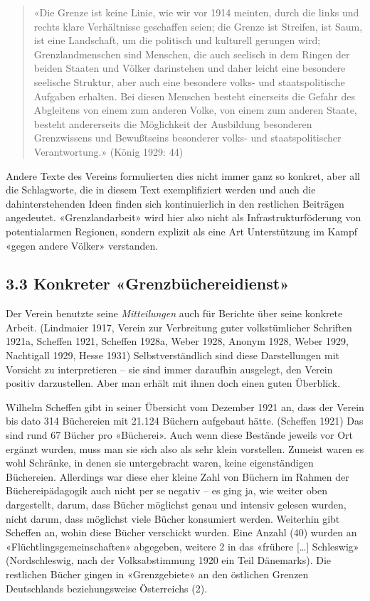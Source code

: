 \documentclass[a4paper,
fontsize=11pt,
oneside,
numbers=noperiodatend,
parskip=half-,
bibliography=totoc,
final
]{scrartcl}
\begin{document}
\begin{quote}
«Die Grenze ist keine Linie, wie wir vor 1914 meinten, durch die links
und rechts klare Verhältnisse geschaffen seien; die Grenze ist Streifen,
ist Saum, ist eine Landschaft, um die politisch und kulturell gerungen
wird; Grenzlandmenschen sind Menschen, die auch seelisch in dem Ringen
der beiden Staaten und Völker darinstehen und daher leicht eine
besondere seelische Struktur, aber auch eine besondere volks- und
staatspolitische Aufgaben erhalten. Bei diesen Menschen besteht
einerseits die Gefahr des Abgleitens von einem zum anderen Volke, von
einem zum anderen Staate, besteht andererseits die Möglichkeit der
Ausbildung besonderen Grenzwissens und Bewußtseins besonderer volks- und
staatspolitischer Verantwortung.» (König 1929: 44)
\end{quote}

Andere Texte des Vereins formulierten dies nicht immer ganz so konkret,
aber all die Schlagworte, die in diesem Text exemplifiziert werden und
auch die dahinterstehenden Ideen finden sich kontinuierlich in den
restlichen Beiträgen angedeutet. «Grenzlandarbeit» wird hier also nicht
als Infrastrukturföderung von potentialarmen Regionen, sondern explizit
als eine Art Unterstützung im Kampf «gegen andere Völker» verstanden.

\hypertarget{konkreter-grenzbuxfcchereidienst}{%
\subsection{3.3 Konkreter
«Grenzbüchereidienst»}\label{konkreter-grenzbuxfcchereidienst}}

Der Verein benutzte seine \emph{Mitteilungen} auch für Berichte über
seine konkrete Arbeit. (Lindmaier 1917, Verein zur Verbreitung guter
volkstümlicher Schriften 1921a, Scheffen 1921, Scheffen 1928a, Weber
1928, Anonym 1928, Weber 1929, Nachtigall 1929, Hesse 1931)
Selbstverständlich sind diese Darstellungen mit Vorsicht zu
interpretieren -- sie sind immer daraufhin ausgelegt, den Verein positiv
darzustellen. Aber man erhält mit ihnen doch einen guten Überblick.

Wilhelm Scheffen gibt in seiner Übersicht vom Dezember 1921 an, dass der
Verein bis dato 314 Büchereien mit 21.124 Büchern aufgebaut hätte.
(Scheffen 1921) Das sind rund 67 Bücher pro «Bücherei». Auch wenn diese
Bestände jeweils vor Ort ergänzt wurden, muss man sie sich also als sehr
klein vorstellen. Zumeist waren es wohl Schränke, in denen sie
untergebracht waren, keine eigenständigen Büchereien. Allerdings war
diese eher kleine Zahl von Büchern im Rahmen der Büchereipädagogik auch
nicht per se negativ -- es ging ja, wie weiter oben dargestellt, darum,
dass Bücher möglichst genau und intensiv gelesen wurden, nicht darum,
dass möglichst viele Bücher konsumiert werden. Weiterhin gibt Scheffen
an, wohin diese Bücher verschickt wurden. Eine Anzahl (40) wurden an
«Flüchtlingsgemeinschaften» abgegeben, weitere 2 in das «frühere
{[}\ldots{]} Schleswig» (Nordschleswig, nach der Volksabstimmung 1920
ein Teil Dänemarks). Die restlichen Bücher gingen in «Grenzgebiete» an
den östlichen Grenzen Deutschlands beziehungsweise Österreichs (2).
\end{document}

